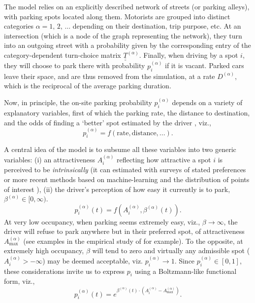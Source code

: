 \documentclass[trsc,reprint]{informs3}
\newcommand{\uul}[1]{\underline{\underline{#1}}}
\newcommand{\alp}{^{(\alpha)}}
\newcommand{\AN}[1]{#1}
\begin{document}
The model relies on an explicitly described network
of streets (or parking alleys), with parking spots located along them. Motorists are
grouped into distinct categories $\alpha=1,\,2,\,\ldots$ depending on their destination, trip purpose, etc. At an intersection (which is a node of the graph representing the network), they turn into an outgoing street 
with a probability given by the corresponding entry of the category-dependent turn-choice matrix 
${\uul{T}}\alp$. Finally, when driving by a spot $i$, they will choose to 
park there with probability $p_i\alp$ if it is vacant. Parked cars leave their space,
and are thus removed from the simulation, at a rate $D\alp$, which is the reciprocal of the  average parking duration.

Now, in principle, the on-site parking probability $p_i\alp$ depends on a variety of explanatory variables, first of which the parking rate, the distance to destination, and the odds of finding a `better' spot estimated by the driver \citep{levy2013exploring,bonsall2004modelling}, viz.,
\begin{equation}
    p_i\alp= f(\mathrm{rate},\mathrm{distance},...).
\end{equation}

A central idea of the model is to subsume all these variables into two generic variables: (i) an attractiveness $A_i\alp$ reflecting how attractive a spot $i$ is perceived to be \emph{intrinsically}
\AN{(it can estimated with surveys of stated preferences \citep{brooke2016factors,lee2017cruising,antolin2018modelling} or more recent methods based on machine-learning and the distribution of points of interest \citep{nie2021public})}, (ii) the driver's perception of how easy it currently is to park, $\beta\alp \in [0,\infty)$. 
\begin{equation}
    p_i\alp(t)= f(A_i\alp,\beta\alp(t)).
    \label{eq:nonBoltzmann_p}
\end{equation}
At very low occupancy, when parking seems extremely easy, viz., $\beta\to \infty$, the driver will refuse to park anywhere but in their preferred spot, of attractiveness $A\alp_{\max}$ (see examples in the empirical study of \citep{paidi2022co2} for example). 
To the opposite, at extremely high occupancy, $\beta$ will tend to zero and virtually any admissible spot 
($A_i\alp>-\infty$) may be deemed acceptable, viz. $p_i\alp \to 1$.
Since $p_i\alp\in[0,1]$, these considerations invite us to express $p_i$ using a Boltzmann-like functional form, viz.,
\begin{equation}
    p_i\alp(t)= e^{\beta\alp(t)\cdot (A_i\alp-A\alp_{\max})}.
    \label{eq:Boltzmann_p}
\end{equation}
\end{document}
